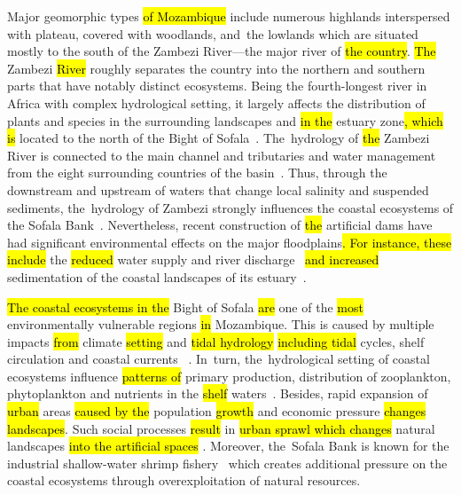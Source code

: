 \documentclass[coasts,article,accept,pdftex,oneauthor]{Definitions/mdpi}
\begin{document}
Major geomorphic types \hl{of Mozambique }include numerous highlands interspersed with plateau, covered with woodlands, and~the lowlands {which are }situated mostly to the south of the Zambezi River{---}the major river of \hl{the country}. \hl{The }Zambezi \hl{River }roughly {separates} the country into the northern and southern parts {that have notably }distinct ecosystems. Being the fourth-longest river in Africa with complex hydrological setting, it largely affects the distribution of plants and species in the surrounding landscapes and \hl{in the }estuary zone\hl{, which is }located to the north of the Bight of Sofala~\cite{Dunham,Dunham1991,Simasiku}. The~hydrology of \hl{the} Zambezi River is connected to the main channel and tributaries and water management from the eight surrounding countries of the basin~\cite{Mbumwae}. {Thus}, through the downstream and upstream of waters that change local salinity and suspended sediments, the~hydrology of Zambezi strongly influences the coastal ecosystems of the Sofala Bank~\cite{NEHAMA2021101891}. {Nevertheless, recent construction of \hl{the} artificial} dams have had significant environmental effects on the major floodplains\hl{. For instance, these include} the \hl{reduced} water supply and river discharge~\cite{Gope} \hl{and increased} sedimentation of the coastal landscapes of its estuary~\cite{Moore}. 

\hl{The coastal ecosystems in the} Bight of Sofala \hl{are} one of the \hl{most} environmentally vulnerable regions \hl{in} Mozambique. This is caused by\hl{ }multiple impacts \hl{from} climate \hl{setting }and \hl{tidal hydrology} \cite{LEAL2009605} \hl{including tidal} cycles, shelf circulation and coastal currents\hl{ }~\cite{MALAUENE20181}. In~turn, the~hydrological setting of coastal ecosystems influence \hl{patterns of }primary production, distribution of zooplankton, phytoplankton and nutrients in the \hl{shelf} waters~\cite{MALAUENE2021107268}. Besides, rapid expansion of \hl{urban} areas \hl{caused by the} population \hl{growth }and economic pressure\hl{ changes landscapes}{. Such social processes }\hl{result} in \hl{urban sprawl which changes }natural landscapes \hl{into the artificial spaces }\cite{JOKARARSANJANI201838}. Moreover, the~Sofala Bank is known for the industrial shallow-water shrimp fishery~\cite{SOUSA2006207,MIGUEL2003365,GAMMELSROD199291} which creates additional pressure on the coastal ecosystems through\hl{ }overexploitation of natural resources. 
\end{document}
